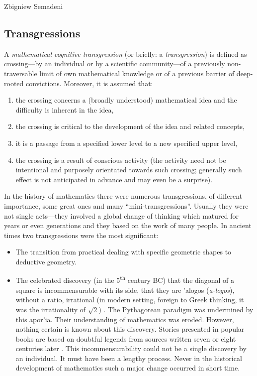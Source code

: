 \begin{artengenv}{Zbigniew Semadeni}
\subsection{Transgressions}
A \textit{mathematical cognitive transgression} (or briefly: a \textit{transgression}) 
is defined as crossing---by an individual or by a scientific community---of 
a previously non-traversable limit of own mathematical knowledge or 
of a previous barrier of deep-rooted convictions. Moreover, it is assumed that: \par
\begin{enumerate} 
\item the crossing concerns a (broadly understood) mathematical idea and the difficulty 
is inherent in the idea, 
\item the crossing is critical to the development of the idea and related 
concepts, 
\item it is a passage from a specified lower level to a new specified upper level, 
\item the crossing is a result of conscious activity (the activity need not 
be intentional and purposely orientated towards such crossing; generally such 
effect is not anticipated in advance and may even be a surprise). 
\end{enumerate} 

In the history of mathematics there were numerous transgressions, of different 
importance, some great ones and many ``mini-transgressions''. Usually they were 
not single acts---they involved a global change of thinking which matured for 
years or even generations and they based on the work of many people. In ancient 
times two transgressions were the most significant: 
\begin{itemize}
\item The transition from practical dealing with specific geometric shapes to deductive 
geometry.  
\item The celebrated discovery (in the 5\textsuperscript{th} century BC) that the diagonal of a 
square is incommensurable with its side, that they are 
\textgreek{'alogos} 
(\textit{a-logos}), without a ratio, irrational (in modern setting, foreign to Greek 
thinking, it was the irrationality of $\sqrt{2}$) \cite[pp.80-81]{Baszmakowa}. 
The Pythagorean paradigm was undermined by this \textgreek{apor'ia}.
Their understanding of mathematics was eroded. However, nothing certain is 
known about this discovery. Stories presented in popular books are based on 
doubtful legends from sources written seven or eight centuries later 
\parencite[p.21, 51]{Knorr}. This incommensurability could not be a single 
discovery by an individual. It must have been a lengthy process. Never in the 
historical development of mathematics such a major change occurred in short time. 
\end{itemize}


\end{artengenv}
